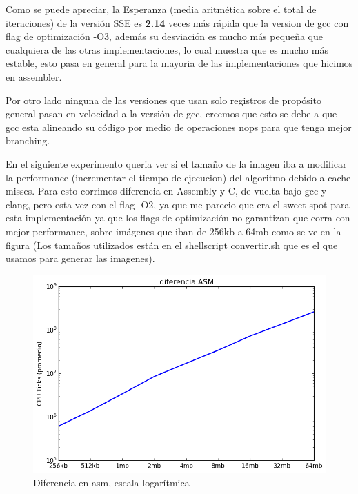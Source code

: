 \documentclass[a4paper]{article}
\begin{document}
Como se puede apreciar, la Esperanza (media aritmética sobre el total de iteraciones) de la versión SSE es \textbf{2.14} veces más rápida que la version de gcc con flag de optimización -O3, además su desviación es mucho más pequeña que cualquiera de las otras implementaciones, lo cual muestra que es mucho más estable, esto pasa en general para la mayoria de las implementaciones que hicimos en assembler.

Por otro lado ninguna de las versiones que usan solo registros de propósito general pasan en velocidad a la versión de gcc, creemos que esto se debe a que gcc esta alineando su código por medio de operaciones nops para que tenga mejor branching.





\newpage

 En el siguiente experimento queria ver si el tamaño de la imagen iba a modificar la performance (incrementar el tiempo de ejecucion) del algoritmo debido a cache misses. Para esto corrimos diferencia en Assembly y C, de vuelta bajo gcc y clang, pero esta vez con el flag -O2, ya que me parecio que era el sweet spot para esta implementación ya que los flags de optimización no garantizan que corra con mejor performance, sobre imágenes que iban de 256kb a 64mb como se ve en la figura (Los tamaños utilizados están en el shellscript convertir.sh que es el que usamos para generar las imagenes). 

\begin{figure}[h]
	\centerline{\includegraphics[scale=0.60]{imagenes/test_performance_size_ASM.png}}
	\caption{Diferencia en asm, escala logarítmica}
\end{figure}
\end{document}
